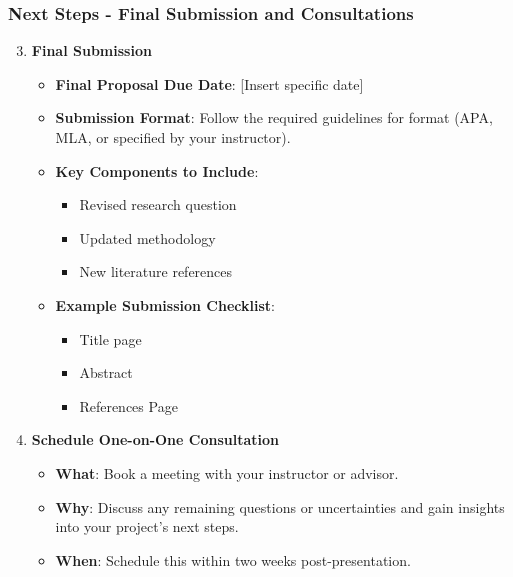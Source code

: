 \documentclass[aspectratio=169]{beamer}
\begin{document}
\begin{frame}[fragile]
    \frametitle{Next Steps - Final Submission and Consultations}
    \begin{enumerate}
        \setcounter{enumi}{2} %
        \item \textbf{Final Submission}
        \begin{itemize}
            \item \textbf{Final Proposal Due Date}: [Insert specific date]
            \item \textbf{Submission Format}: Follow the required guidelines for format (APA, MLA, or specified by your instructor).
            \item \textbf{Key Components to Include}:
            \begin{itemize}
                \item Revised research question
                \item Updated methodology
                \item New literature references
            \end{itemize}
            \item \textbf{Example Submission Checklist}:
            \begin{itemize}
                \item Title page
                \item Abstract
                \item References Page
            \end{itemize}
        \end{itemize}

        \item \textbf{Schedule One-on-One Consultation}
        \begin{itemize}
            \item \textbf{What}: Book a meeting with your instructor or advisor.
            \item \textbf{Why}: Discuss any remaining questions or uncertainties and gain insights into your project's next steps.
            \item \textbf{When}: Schedule this within two weeks post-presentation.
        \end{itemize}
    \end{enumerate}
\end{frame}
\end{document}
